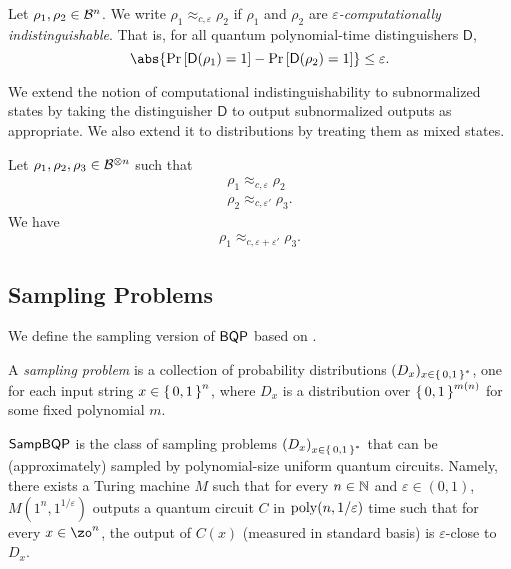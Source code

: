 \begin{definition}
	Let $\rho_1,\rho_2\in\mathcal{B}^n$.
	We write $\rho_1\approx_{c,\varepsilon}\rho_2$ if $\rho_1$ and $\rho_2$ are \emph{$\varepsilon$-computationally indistinguishable}.
	That is, for all quantum polynomial-time distinguishers $\mathsf{D}$,
	$$\abs{\Pr\left[\mathsf{D}(\rho_1)=1\right]-\Pr\left[\mathsf{D}(\rho_2)=1\right]}\leq\varepsilon.$$
\end{definition}
We extend the notion of computational indistinguishability to subnormalized states by taking the distinguisher $\mathsf{D}$ to output subnormalized outputs as appropriate.
We also extend it to distributions by treating them as mixed states.

\begin{lem} \label{lem:computational-triangle0}
    Let $\rho_1, \rho_2, \rho_3\in\mathcal{B}^{\otimes n}$ such that 
    \begin{align}
		\rho_1\approx_{c, \varepsilon}\rho_2\\
		\rho_2\approx_{c, \varepsilon'}\rho_3.
    \end{align}
    We have 
    \begin{align}
		\rho_1\approx_{c, \varepsilon+\varepsilon'}\rho_3.
    \end{align}
\end{lem}

\subsection{Sampling Problems}

We define the sampling version of $\operatorname{\mathsf{BQP}}$ based on \cite{aaronson_2013}.

\begin{definition} 
	A \emph{sampling problem} is a collection of probability distributions $(D_x)_{x\in\set{0, 1}^*}$, one for each input string $x\in\set{0,1}^n$, where $D_x$ is a distribution over $\set{0,1}^{m(n)}$ for some fixed polynomial $m$.
\end{definition}

\begin{definition} [$\SampBQP$]
	$\SampBQP$ is the class of sampling problems $\left(D_x\right)_{x\in\set{0, 1}^*}$ that can be (approximately) sampled by polynomial-size uniform quantum circuits. Namely, there exists a Turing machine $M$ such that for every $n \in \mathbb{N}$ and $\varepsilon \in (0,1)$, $M(1^n, 1^{1/\varepsilon})$ outputs a quantum circuit $C$ in $\operatorname*{\operatorname{poly}}(n, 1/\varepsilon)$ time such that for every $x \in \zo^n$, the output of $C(x)$ (measured in standard basis) is $\varepsilon$-close to $D_x$.
\end{definition}

